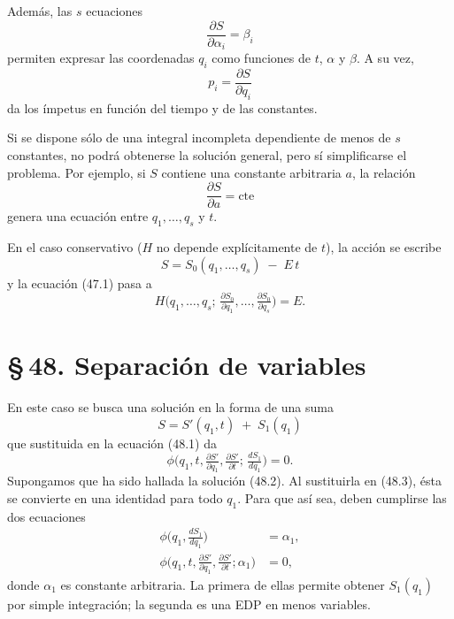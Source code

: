 \documentclass[12pt]{article}
\begin{document}
\noindent Además, las \(s\) ecuaciones
\begin{equation}
\frac{\partial S}{\partial \alpha_i} = \beta_i
\tag{47.4}
\end{equation}
permiten expresar las coordenadas \(q_i\) como funciones de \(t\), \(\alpha\) y \(\beta\). A su vez,
\[
p_i = \frac{\partial S}{\partial q_i}
\]
da los ímpetus en función del tiempo y de las constantes.

\noindent Si se dispone sólo de una integral incompleta dependiente de menos de \(s\) constantes, no podrá obtenerse la solución general, pero sí simplificarse el problema. Por ejemplo, si \(S\) contiene una constante arbitraria \(a\), la relación
\[
\frac{\partial S}{\partial a} = \text{cte}
\]
genera una ecuación entre \(q_1,\dots,q_s\) y \(t\).

\noindent En el caso conservativo (\(H\) no depende explícitamente de \(t\)), la acción se escribe
\begin{equation}
S = S_0(q_1,\dots,q_s)\;-\;E\,t
\tag{47.5}
\end{equation}
y la ecuación (47.1) pasa a
\begin{equation}
H\bigl(q_1,\dots,q_s;\,\tfrac{\partial S_0}{\partial q_1},\dots,\tfrac{\partial S_0}{\partial q_s}\bigr)
=E.
\tag{47.6}
\end{equation}
\section*{\S\,48. Separación de variables}

\noindent En este caso se busca una solución en la forma de una suma
\begin{equation}
S = S'(q_{1},t) \;+\; S_{1}(q_{1})
\tag{48.2}
\end{equation}
que sustituida en la ecuación (48.1) da
\begin{equation}
\phi\!\bigl(q_{1},t,\tfrac{\partial S'}{\partial q_{1}},
\tfrac{\partial S'}{\partial t};\,\tfrac{dS_{1}}{dq_{1}}\bigr)
=0.
\tag{48.3}
\end{equation}
Supongamos que ha sido hallada la solución (48.2). Al sustituirla en (48.3), ésta se convierte en una identidad para todo \(q_{1}\). Para que así sea, deben cumplirse las dos ecuaciones
\begin{align}
\phi\!\bigl(q_{1},\tfrac{dS_{1}}{dq_{1}}\bigr)&=\alpha_{1},
\tag{48.4}\\
\phi\!\bigl(q_{1},t,\tfrac{\partial S'}{\partial q_{1}},
\tfrac{\partial S'}{\partial t};\alpha_{1}\bigr)&=0,
\tag{48.5}
\end{align}
donde \(\alpha_{1}\) es constante arbitraria. La primera de ellas permite obtener \(S_{1}(q_{1})\) por simple integración; la segunda es una EDP en menos variables.
\end{document}

